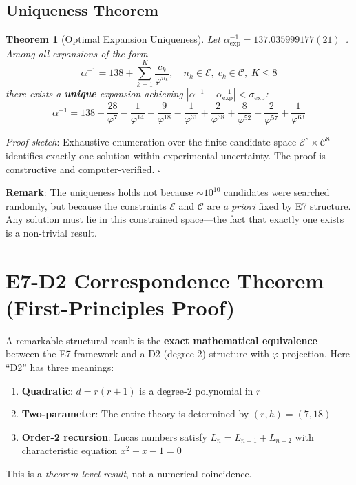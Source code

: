 \documentclass[11pt,a4paper]{article}
\newtheorem{theorem}{Theorem}
\begin{document}
\subsection{Uniqueness Theorem}

\begin{theorem}[Optimal Expansion Uniqueness]
Let $\alpha^{-1}_{\exp} = 137.035999177(21)$~\cite{CODATA2022}. Among all expansions of the form
\begin{equation}
\alpha^{-1} = 138 + \sum_{k=1}^{K} \frac{c_k}{\varphi^{n_k}}, \quad n_k \in \mathcal{E}, \; c_k \in \mathcal{C}, \; K \leq 8
\end{equation}
there exists a \textbf{unique} expansion achieving $|\alpha^{-1} - \alpha^{-1}_{\exp}| < \sigma_{\exp}$:
\begin{equation}
\alpha^{-1} = 138 - \frac{28}{\varphi^{7}} - \frac{1}{\varphi^{14}} + \frac{9}{\varphi^{18}} - \frac{1}{\varphi^{31}} + \frac{2}{\varphi^{38}} + \frac{8}{\varphi^{52}} + \frac{2}{\varphi^{57}} + \frac{1}{\varphi^{63}}
\end{equation}
\end{theorem}

\textit{Proof sketch}: Exhaustive enumeration over the finite candidate space $\mathcal{E}^8 \times \mathcal{C}^8$ identifies exactly one solution within experimental uncertainty. The proof is constructive and computer-verified. \hfill $\square$

\textbf{Remark}: The uniqueness holds not because $\sim 10^{10}$ candidates were searched randomly, but because the constraints $\mathcal{E}$ and $\mathcal{C}$ are \textit{a priori} fixed by E7 structure. Any solution must lie in this constrained space---the fact that exactly one exists is a non-trivial result.

\section{E7-D2 Correspondence Theorem (First-Principles Proof)}
\label{sec:e7d2-duality-proof}

A remarkable structural result is the \textbf{exact mathematical equivalence} between the E7 framework and a D2 (degree-2) structure with $\varphi$-projection. Here ``D2'' has three meanings:
\begin{enumerate}
\item \textbf{Quadratic}: $d = r(r+1)$ is a degree-2 polynomial in $r$
\item \textbf{Two-parameter}: The entire theory is determined by $(r, h) = (7, 18)$
\item \textbf{Order-2 recursion}: Lucas numbers satisfy $L_n = L_{n-1} + L_{n-2}$ with characteristic equation $x^2 - x - 1 = 0$
\end{enumerate}
This is a \textit{theorem-level result}, not a numerical coincidence.
\end{document}
